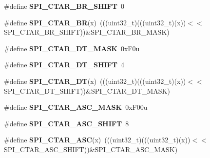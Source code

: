 \begin{DoxyCompactItemize}
\item 
\#define {\bfseries S\+P\+I\+\_\+\+C\+T\+A\+R\+\_\+\+B\+R\+\_\+\+S\+H\+I\+FT}~0\hypertarget{group__SPI__Register__Masks_gad988143e0be530acb59dca0fad52ec0b}{}\label{group__SPI__Register__Masks_gad988143e0be530acb59dca0fad52ec0b}

\item 
\#define {\bfseries S\+P\+I\+\_\+\+C\+T\+A\+R\+\_\+\+BR}(x)~(((uint32\+\_\+t)(((uint32\+\_\+t)(x))$<$$<$S\+P\+I\+\_\+\+C\+T\+A\+R\+\_\+\+B\+R\+\_\+\+S\+H\+I\+FT))\&S\+P\+I\+\_\+\+C\+T\+A\+R\+\_\+\+B\+R\+\_\+\+M\+A\+SK)\hypertarget{group__SPI__Register__Masks_ga8ef1d047cb27c76c57b494ffeada5259}{}\label{group__SPI__Register__Masks_ga8ef1d047cb27c76c57b494ffeada5259}

\item 
\#define {\bfseries S\+P\+I\+\_\+\+C\+T\+A\+R\+\_\+\+D\+T\+\_\+\+M\+A\+SK}~0x\+F0u\hypertarget{group__SPI__Register__Masks_ga7d4ee19c78f67b68c6320eefe6a53ac0}{}\label{group__SPI__Register__Masks_ga7d4ee19c78f67b68c6320eefe6a53ac0}

\item 
\#define {\bfseries S\+P\+I\+\_\+\+C\+T\+A\+R\+\_\+\+D\+T\+\_\+\+S\+H\+I\+FT}~4\hypertarget{group__SPI__Register__Masks_gaac557ee81ac4ec00ee6280d5b761edf1}{}\label{group__SPI__Register__Masks_gaac557ee81ac4ec00ee6280d5b761edf1}

\item 
\#define {\bfseries S\+P\+I\+\_\+\+C\+T\+A\+R\+\_\+\+DT}(x)~(((uint32\+\_\+t)(((uint32\+\_\+t)(x))$<$$<$S\+P\+I\+\_\+\+C\+T\+A\+R\+\_\+\+D\+T\+\_\+\+S\+H\+I\+FT))\&S\+P\+I\+\_\+\+C\+T\+A\+R\+\_\+\+D\+T\+\_\+\+M\+A\+SK)\hypertarget{group__SPI__Register__Masks_ga48f6e8c7555056687cfcc2c56fc63c46}{}\label{group__SPI__Register__Masks_ga48f6e8c7555056687cfcc2c56fc63c46}

\item 
\#define {\bfseries S\+P\+I\+\_\+\+C\+T\+A\+R\+\_\+\+A\+S\+C\+\_\+\+M\+A\+SK}~0x\+F00u\hypertarget{group__SPI__Register__Masks_gad15c92f5474cc1ba1ca2af14c92cbf26}{}\label{group__SPI__Register__Masks_gad15c92f5474cc1ba1ca2af14c92cbf26}

\item 
\#define {\bfseries S\+P\+I\+\_\+\+C\+T\+A\+R\+\_\+\+A\+S\+C\+\_\+\+S\+H\+I\+FT}~8\hypertarget{group__SPI__Register__Masks_gadbf91ef3bf1d4943ab782ff027d121bd}{}\label{group__SPI__Register__Masks_gadbf91ef3bf1d4943ab782ff027d121bd}

\item 
\#define {\bfseries S\+P\+I\+\_\+\+C\+T\+A\+R\+\_\+\+A\+SC}(x)~(((uint32\+\_\+t)(((uint32\+\_\+t)(x))$<$$<$S\+P\+I\+\_\+\+C\+T\+A\+R\+\_\+\+A\+S\+C\+\_\+\+S\+H\+I\+FT))\&S\+P\+I\+\_\+\+C\+T\+A\+R\+\_\+\+A\+S\+C\+\_\+\+M\+A\+SK)\hypertarget{group__SPI__Register__Masks_ga2cd43b6b9241829083a88d903cc1ca2a}{}\label{group__SPI__Register__Masks_ga2cd43b6b9241829083a88d903cc1ca2a}


\end{DoxyCompactItemize}
